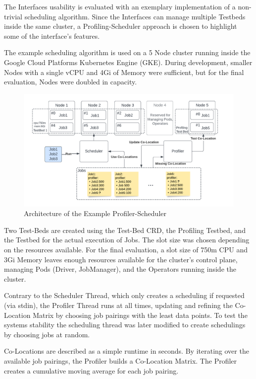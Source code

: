 \documentclass[
]{article}
\author{}
\date{}
\begin{document}
The Interfaces usability is evaluated with an exemplary implementation
of a non-trivial scheduling algorithm. Since the Interfaces can manage
multiple Testbeds inside the same cluster, a Profiling-Scheduler
approach is chosen to highlight some of the interface's features.

The example scheduling algorithm is used on a 5 Node cluster running
inside the Google Cloud Platforms Kubernetes Engine (GKE). During
development, smaller Nodes with a single vCPU and 4Gi of Memory were
sufficient, but for the final evaluation, Nodes were doubled in
capacity.

\begin{figure}
\centering
\includegraphics{graphics/evaluation_example_scheduler_arch.pdf}
\caption{Architecture of the Example Profiler-Scheduler}
\end{figure}

Two Test-Beds are created using the Test-Bed CRD, the Profiling Testbed,
and the Testbed for the actual execution of Jobs. The slot size was
chosen depending on the resources available. For the final evaluation, a
slot size of 750m CPU and 3Gi Memory leaves enough resources available
for the cluster's control plane, managing Pods (Driver, JobManager), and
the Operators running inside the cluster.

Contrary to the Scheduler Thread, which only creates a scheduling if
requested (via stdin), the Profiler Thread runs at all times, updating
and refining the Co-Location Matrix by choosing job pairings with the
least data points. To test the systems stability the scheduling thread
was later modified to create schedulings by choosing jobs at random.

Co-Locations are described as a simple runtime in seconds. By iterating
over the available job pairings, the Profiler builds a Co-Location
Matrix. The Profiler creates a cumulative moving average for each job
pairing.
\end{document}
